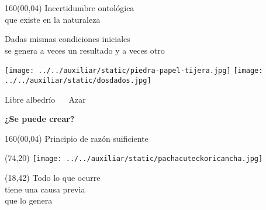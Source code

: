 \documentclass[shownotes,aspectratio=169]{beamer}
\begin{document}
\begin{frame}[plain]
\begin{textblock}{160}(00,04)
\centering \LARGE Incertidumbre ontológica \\
\Large que existe en la naturaleza
\end{textblock}
\vspace{2cm} \centering


Dadas mismas condiciones iniciales \\
se genera a veces un resultado y a veces otro

\pause

\vspace{0.7cm}

\texttt{[image: ../../auxiliar/static/piedra-papel-tijera.jpg]} \hspace{0.5cm}
\texttt{[image: ../../auxiliar/static/dosdados.jpg]}

{\small Libre albedrío \ \hspace{2cm} \ Azar \hspace{0.4cm}}


\pause
\vspace{0.5cm}
\textbf{¿Se puede crear?}


\end{frame}



\begin{frame}[plain]
\begin{textblock}{160}(00,04)
\centering
\LARGE Principio de razón suificiente \\
\end{textblock}
\vspace{1.75cm} \Large  \centering



\begin{textblock}{70}(74,20)
\texttt{[image: ../../auxiliar/static/pachacuteckoricancha.jpg]}
\end{textblock}

\begin{textblock}{60}(18,42)
\centering Todo lo que ocurre \\ tiene una causa previa \\ que lo genera
\end{textblock}



\end{frame}
\end{document}
